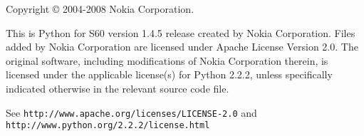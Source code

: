 Copyright {\copyright} 2004-2008 Nokia Corporation. 

This is Python for S60 version 1.4.5 release created by Nokia
Corporation. Files added by Nokia Corporation are licensed under
Apache License Version 2.0. The original software, including
modifications of Nokia Corporation therein, is licensed under the
applicable license(s) for Python 2.2.2, unless specifically indicated
otherwise in the relevant source code file.

See \verb|http://www.apache.org/licenses/LICENSE-2.0|
and \verb|http://www.python.org/2.2.2/license.html|
